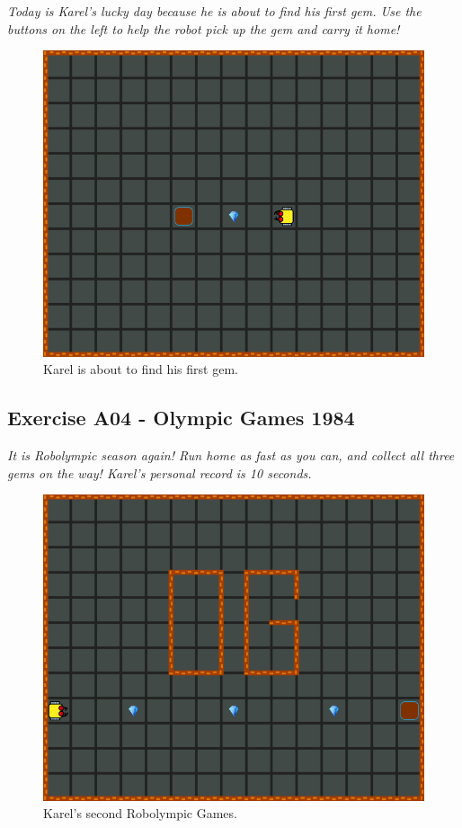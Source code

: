 \documentclass[article,A4,12pt]{llncs}
\begin{document}
{\em Today is Karel's lucky day because he is about to find his first gem. 
Use the buttons on the left to help the robot pick up the gem and carry it 
home!}

\begin{figure}[!ht]
\begin{center}
\includegraphics[height=0.4\textwidth]{img/a03.png}
\end{center}
\vspace{-4mm}
\caption{Karel is about to find his first gem.}
\label{fig:a03}
\vspace{-1cm}
\end{figure}
\noindent

\newpage
\subsection{Exercise A04 - Olympic Games 1984}

{\em It is Robolympic season again! Run home as fast as you can, 
and collect all three gems on the way! Karel's personal record is 10 seconds.}


\begin{figure}[!ht]
\begin{center}
\includegraphics[height=0.4\textwidth]{img/a04.png}
\end{center}
\vspace{-4mm}
\caption{Karel's second Robolympic Games.}
\label{fig:a04}
\vspace{-1cm}
\end{figure}
\noindent
\end{document}
